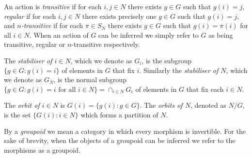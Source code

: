 	An action is \textit{transitive} if for each $i, j \in N$ there exists $g \in G$ such that $g(i) = j$, \textit{regular} if for each $i, j \in N$ there exists precisely one $g \in G$ such that $g(i) = j$, and \textit{$n$-transitive} if for each $\pi \in S_N$ there exists $g \in G$ such that $g(i) = \pi(i)$ for all $i \in N$. When an action of $G$ can be inferred we simply refer to $G$ as being transitive, regular or $n$-transitive respectively.
	
	The \textit{stabiliser of $i \in N$}, which we denote as $G_i$, is the subgroup $\{g \in G: g(i) = i\}$ of elements in $G$ that fix $i$. Similarly the \textit{stabiliser of $N$}, which we denote as $G_N$, is the normal subgroup $\{g \in G: g(i) = i \text{ for all } i \in N\} = \cap_{i \in N}G_i$ of elements in $G$ that fix each $i \in N$.
	
	The \textit{orbit of $i \in N$} is $G(i) = \{g(i): g \in G\}$. The \textit{orbits of $N$}, denoted as $N/G$, is the set $\{G(i): i \in N\}$ which forms a partition of $N$.
	
	By a \textit{groupoid} we mean a category in which every morphism is invertible. For the sake of brevity, when the objects of a groupoid can be inferred we refer to the morphisms as a groupoid. 